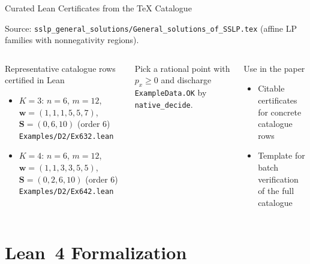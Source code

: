 \documentclass[aspectratio=169,t,10pt]{beamer}
\newcommand{\code}[1]{\texttt{\small #1}}
\begin{document}
\begin{frame}{Curated Lean Certificates from the TeX Catalogue}

\small
Source: \code{sslp\_general\_solutions/General\_solutions\_of\_SSLP.tex}
(affine LP families with nonnegativity regions).

\begin{columns}[T]
\begin{exampleblock}{Representative catalogue rows certified in Lean}
\footnotesize
\begin{itemize}\setlength\itemsep{1pt}
\item $K=3$: $n=6$, $m=12$, $\mathbf w=(1,1,1,5,5,7)$, $\mathbf S=(0,6,10)$ (order $6$)
  \hfill \code{Examples/D2/Ex632.lean}
\item $K=4$: $n=6$, $m=12$, $\mathbf w=(1,1,3,3,5,5)$, $\mathbf S=(0,2,6,10)$ (order $6$)
  \hfill \code{Examples/D2/Ex642.lean}
\end{itemize}
\end{exampleblock}

\footnotesize
Pick a rational point with $p_x\ge 0$ and discharge \code{ExampleData.OK} by \code{native\_decide}.

\begin{block}{Use in the paper}
\footnotesize
\begin{itemize}\setlength\itemsep{1pt}
\item Citable certificates for concrete catalogue rows
\item Template for batch verification of the full catalogue
\end{itemize}
\end{block}
\end{columns}
\end{frame}

\section{Lean~4 Formalization}
\end{document}
